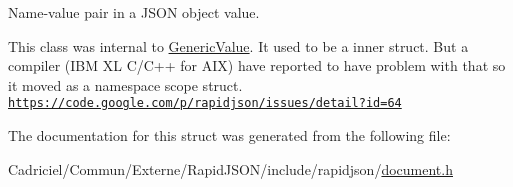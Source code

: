 Name-\/value pair in a J\+S\+ON object value. 

This class was internal to \hyperlink{class_generic_value}{Generic\+Value}. It used to be a inner struct. But a compiler (I\+BM XL C/\+C++ for A\+IX) have reported to have problem with that so it moved as a namespace scope struct. \href{https://code.google.com/p/rapidjson/issues/detail?id=64}{\tt https\+://code.\+google.\+com/p/rapidjson/issues/detail?id=64} 

The documentation for this struct was generated from the following file\+:\begin{DoxyCompactItemize}
\item 
Cadriciel/\+Commun/\+Externe/\+Rapid\+J\+S\+O\+N/include/rapidjson/\hyperlink{document_8h}{document.\+h}\end{DoxyCompactItemize}
